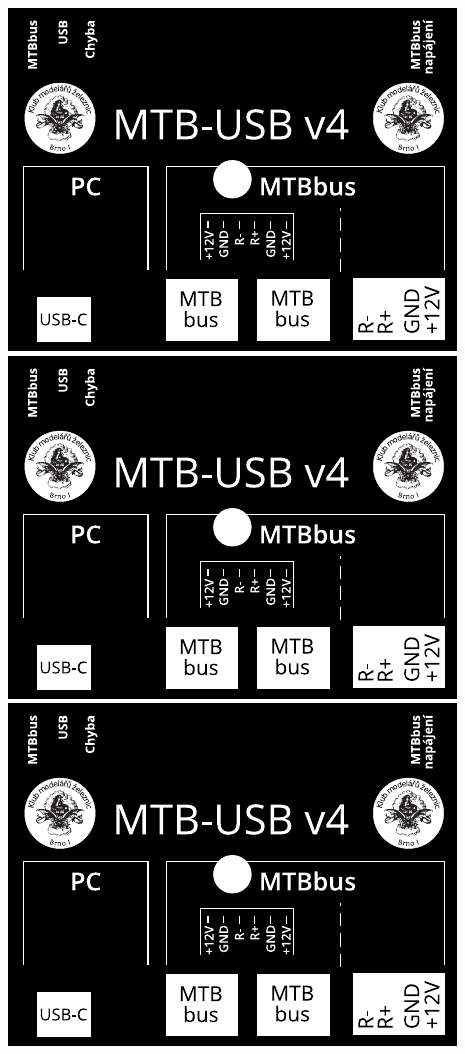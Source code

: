 \documentclass[12pt,a4paper,landscape]{article}
\begin{document}
\includegraphics{single.pdf}
\includegraphics{single.pdf}
\includegraphics{single.pdf}
\end{document}
